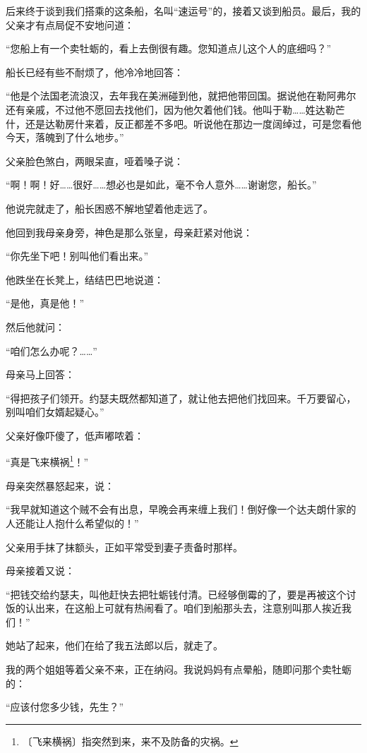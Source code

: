 \documentclass[12pt,UTF-8,openany]{ctexbook}
\begin{document}
\begin{normalsize}
    后来终于谈到我们搭乘的这条船，名叫“速运号”的，接着又谈到船员。最后，我的父亲才有点局促不安地问道：
    
    “您船上有一个卖牡蛎的，看上去倒很有趣。您知道点儿这个人的底细吗？”
    
    船长已经有些不耐烦了，他冷冷地回答：
    
    “他是个法国老流浪汉，去年我在美洲碰到他，就把他带回国。据说他在勒阿弗尔还有亲戚，不过他不愿回去找他们，因为他欠着他们钱。他叫于勒……姓达勒芒什，还是达勒房什来着，反正都差不多吧。听说他在那边一度阔绰过，可是您看他今天，落魄到了什么地步。”
    
    父亲脸色煞白，两眼呆直，哑着嗓子说：
    
    “啊！啊！好……很好……想必也是如此，毫不令人意外……谢谢您，船长。”
    
    他说完就走了，船长困惑不解地望着他走远了。
    
    他回到我母亲身旁，神色是那么张皇，母亲赶紧对他说：
    
    “你先坐下吧！别叫他们看出来。”
    
    他跌坐在长凳上，结结巴巴地说道：
    
    “是他，真是他！”
    
    然后他就问：
    
    “咱们怎么办呢？……”
    
    母亲马上回答：
    
    “得把孩子们领开。约瑟夫既然都知道了，就让他去把他们找回来。千万要留心，别叫咱们女婿起疑心。”
    
    父亲好像吓傻了，低声嘟哝着：
    
    “真是飞来横祸\footnote{〔飞来横祸〕指突然到来，来不及防备的灾祸。}！”
    
    母亲突然暴怒起来，说：
    
    “我早就知道这个贼不会有出息，早晚会再来缠上我们！倒好像一个达夫朗什家的人还能让人抱什么希望似的！”
    
    父亲用手抹了抹额头，正如平常受到妻子责备时那样。
    
    母亲接着又说：
    
    “把钱交给约瑟夫，叫他赶快去把牡蛎钱付清。已经够倒霉的了，要是再被这个讨饭的认出来，在这船上可就有热闹看了。咱们到船那头去，注意别叫那人挨近我们！”
    
    她站了起来，他们在给了我五法郎以后，就走了。
    
    我的两个姐姐等着父亲不来，正在纳闷。我说妈妈有点晕船，随即问那个卖牡蛎的：
    
    “应该付您多少钱，先生？”
    

\end{normalsize}
\end{document}
